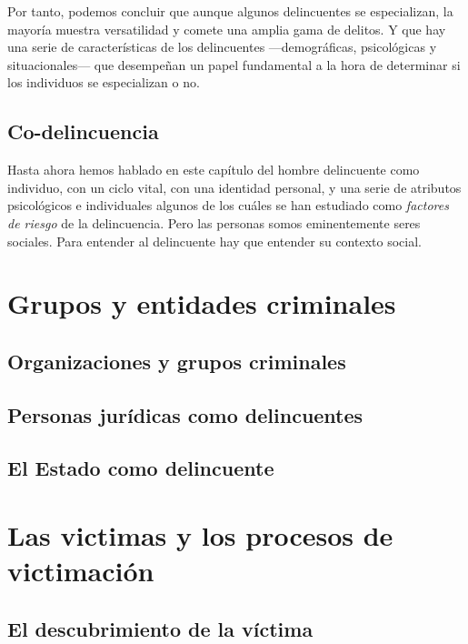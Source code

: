 \documentclass[
  spanish,
  letterpaper,
  DIV=11,
  numbers=noendperiod]{scrreprt}
\begin{document}
Por tanto, podemos concluir que aunque algunos delincuentes se
especializan, la mayoría muestra versatilidad y comete una amplia gama
de delitos. Y que hay una serie de características de los delincuentes
---demográficas, psicológicas y situacionales--- que desempeñan un papel
fundamental a la hora de determinar si los individuos se especializan o
no.

\section{Co-delincuencia}\label{co-delincuencia}

Hasta ahora hemos hablado en este capítulo del hombre delincuente como
individuo, con un ciclo vital, con una identidad personal, y una serie
de atributos psicológicos e individuales algunos de los cuáles se han
estudiado como \emph{factores de riesgo} de la delincuencia. Pero las
personas somos eminentemente seres sociales. Para entender al
delincuente hay que entender su contexto social.

\chapter{Grupos y entidades
criminales}\label{grupos-y-entidades-criminales}

\section{Organizaciones y grupos
criminales}\label{organizaciones-y-grupos-criminales}

\section{Personas jurídicas como
delincuentes}\label{personas-juruxeddicas-como-delincuentes}

\section{El Estado como delincuente}\label{el-estado-como-delincuente}

\chapter{Las victimas y los procesos de
victimación}\label{las-victimas-y-los-procesos-de-victimaciuxf3n}

\section{El descubrimiento de la
víctima}\label{el-descubrimiento-de-la-vuxedctima}
\end{document}
